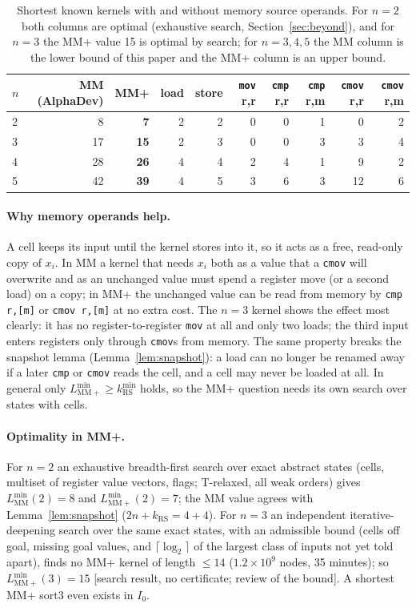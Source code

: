 \begin{table}[h]\centering\small
\begin{tabular}{lrrrrrrrrr}\toprule
$n$ & MM (AlphaDev) & MM+ & load & store & \texttt{mov} r,r & \texttt{cmp} r,r & \texttt{cmp} r,m & \texttt{cmov} r,r & \texttt{cmov} r,m \\\midrule
2 & 8  & \textbf{7}  & 2 & 2 & 0 & 0 & 1 & 0 & 2 \\
3 & 17 & \textbf{15} & 2 & 3 & 0 & 0 & 3 & 3 & 4 \\
4 & 28 & \textbf{26} & 4 & 4 & 2 & 4 & 1 & 9 & 2 \\
5 & 42 & \textbf{39} & 4 & 5 & 3 & 6 & 3 & 12 & 6 \\\bottomrule
\end{tabular}
\caption{Shortest known kernels with and without memory source operands. For $n = 2$ both columns are optimal
(exhaustive search, Section~\ref{sec:beyond}), and for $n = 3$ the MM+ value 15 is optimal by search; for $n = 3, 4, 5$ the MM column is the lower bound of this paper \pending{}
and the MM+ column is an upper bound.}
\label{tab:beyond}
\end{table}

\paragraph{Why memory operands help.} A cell keeps its input until the kernel stores into it, so it acts as a free,
read-only copy of $x_i$. In MM a kernel that needs $x_i$ both as a value that a \texttt{cmov} will overwrite and as an
unchanged value must spend a register move (or a second load) on a copy; in MM+ the unchanged value can be read from memory by
\texttt{cmp r,[m]} or \texttt{cmov r,[m]} at no extra cost. The $n = 3$ kernel shows the effect most clearly: it has no
register-to-register \texttt{mov} at all and only two loads; the third input enters registers only through \texttt{cmov}s from
memory. The same property breaks the snapshot lemma (Lemma~\ref{lem:snapshot}): a load can no longer be renamed away if a later
\texttt{cmp} or \texttt{cmov} reads the cell, and a cell may never be loaded at all. In general only
$L^{\min}_{\mathrm{MM+}} \ge k^{\min}_{\mathrm{RS}}$ holds, so the MM+ question needs its own search over states with cells.

\paragraph{Optimality in MM+.} For $n = 2$ an exhaustive breadth-first search over exact abstract states (cells, multiset of
register value vectors, flags; T-relaxed, all weak orders) gives $L^{\min}_{\mathrm{MM}}(2) = 8$ and
$L^{\min}_{\mathrm{MM+}}(2) = 7$; the MM value agrees with Lemma~\ref{lem:snapshot} ($2n + k_{\mathrm{RS}} = 4 + 4$). For $n = 3$
an independent iterative-deepening search over the same exact states, with an admissible bound (cells off goal, missing
goal values, and $\lceil\log_2\rceil$ of the largest class of inputs not yet told apart), finds no MM+ kernel of length
$\le 14$ ($1.2 \times 10^9$ nodes, 35 minutes); so $L^{\min}_{\mathrm{MM+}}(3) = 15$ \pending{} [search result, no
certificate; review of the bound]. A shortest MM+ sort3 even exists in $I_0$.

